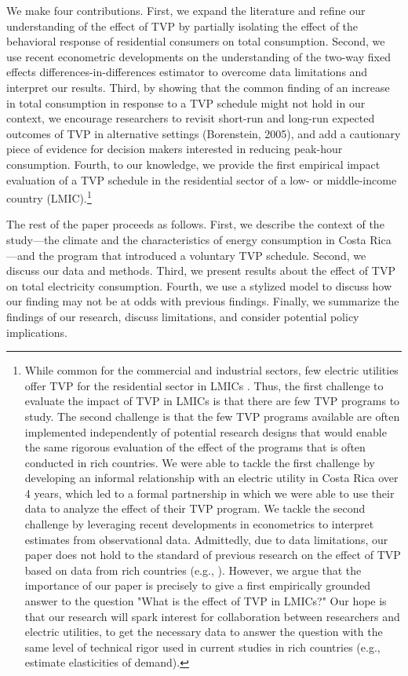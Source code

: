 \documentclass[12pt]{article}
\begin{document}
We make four contributions. First, we expand the literature and refine our understanding of the effect of TVP by partially isolating the effect of the behavioral response of residential consumers on total consumption. Second, we use recent econometric developments on the understanding of the two-way fixed effects differences-in-differences estimator to overcome data limitations and interpret our results. Third, by showing that the common finding of an increase in total consumption in response to a TVP schedule might not hold in our context, we encourage researchers to revisit short-run and long-run expected outcomes of TVP in alternative settings (Borenstein, 2005), and add a cautionary piece of evidence for decision makers interested in reducing peak-hour consumption. Fourth, to our knowledge, we provide the first empirical impact evaluation of a TVP schedule in the residential sector of a low- or middle-income country (LMIC).\footnote{While common for the commercial and industrial sectors, few electric utilities offer TVP for the residential sector in LMICs \citep{duttaLiteratureReviewDynamic2017}. Thus, the first challenge to evaluate the impact of TVP in LMICs is that there are few TVP programs to study. The second challenge is that the few TVP programs available are often implemented independently of potential research designs that would enable the same rigorous evaluation of the effect of the programs that is often conducted in rich countries. We were able to tackle the first challenge by developing an informal relationship with an electric utility in Costa Rica over 4 years, which led to a formal partnership in which we were able to use their data to analyze the effect of their TVP program. We tackle the second challenge by leveraging recent developments in econometrics to interpret estimates from observational data. Admittedly, due to data limitations, our paper does not hold to the standard of previous research on the effect of TVP based on data from rich countries (e.g., \cite{allcottRethinkingRealtimeElectricity2011}). However, we argue that the importance of our paper is precisely to give a first empirically grounded answer to the question "What is the effect of TVP in LMICs?" Our hope is that our research will spark interest for collaboration between researchers and electric utilities, to get the necessary data to answer the question with the same level of technical rigor used in current studies in rich countries (e.g., estimate elasticities of demand).}

The rest of the paper proceeds as follows. First, we describe the context of the study---the climate and the characteristics of energy consumption in Costa Rica---and the program that introduced a voluntary TVP schedule. Second, we discuss our data and methods. Third, we present results about the effect of TVP on total electricity consumption. Fourth, we use a stylized model to discuss how our finding may not be at odds with previous findings. Finally, we summarize the findings of our research, discuss limitations, and consider potential policy implications.
\end{document}
